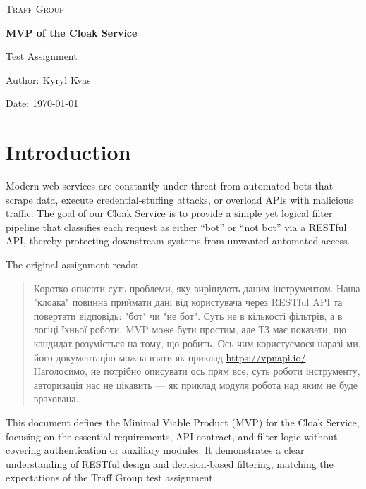 \documentclass[12pt,a4paper]{article}
\begin{document}

\begin{titlepage}
  \centering
  {\scshape\LARGE Traff Group\par}
  \vspace{1.5cm}
  {\Huge\bfseries MVP of the Cloak Service\par}
  \vspace{1cm}
  {\Large Test Assignment\par}
  \vfill
  {\large Author: \underline{Kyryl Kvas}\par}
  {\large Date: \today\par}
\end{titlepage}

\tableofcontents
\newpage


\section{Introduction}

Modern web services are constantly under threat from automated bots that scrape data, execute credential‐stuffing attacks, or overload APIs with malicious traffic. The goal of our Cloak Service is to provide a simple yet logical filter pipeline that classifies each request as either “bot” or “not bot” via a RESTful API, thereby protecting downstream systems from unwanted automated access.

The original assignment reads:

\begin{quote}
Коротко описати суть проблеми, яку вирішують даним інструментом. Наша "клоака" повинна приймати дані  
від користувача через RESTful API та повертати відповідь: "бот" чи "не бот". Суть не в кількості фільтрів, а  
в логіці їхньої роботи. MVP може бути простим, але ТЗ має показати, що кандидат розуміється на тому, що  
робить. Ось чим користуємося наразі ми, його документацію можна взяти як приклад \url{https://vpnapi.io/}.  
Наголосимо, не потрібно описувати ось прям все, суть роботи інструменту, авторизація нас не цікавить — як  
приклад модуля робота над яким не буде врахована.
\end{quote}

This document defines the Minimal Viable Product (MVP) for the Cloak Service, focusing on the essential requirements, API contract, and filter logic without covering authentication or auxiliary modules. It demonstrates a clear understanding of RESTful design and decision‐based filtering, matching the expectations of the Traff Group test assignment.
\end{document}
